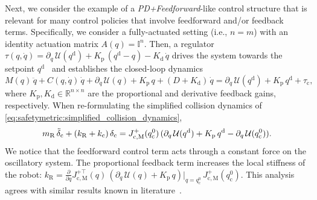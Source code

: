 Next, we consider the example of a \emph{PD+Feedforward}-like control structure that is relevant for many control policies that involve feedforward and/or feedback terms.
Specifically, we consider a fully-actuated setting (i.e., $n=m$) with an identity actuation matrix $A(q) = \mathbb{I}^n$.
Then, a regulator $\tau(q,\dot{q}) = \partial_{q} \, \mathcal{U}( q^\mathrm{d}) + K_\mathrm{p} \, (q^\mathrm{d}-q) - K_\mathrm{d} \, \dot{q}$ drives the system towards the setpoint $q^\mathrm{d}$~\citep{della2023model} and establishes the closed-loop dynamics
\begin{equation}
    M(q) \, \ddot{q} + C(q, \dot{q}) \, \dot{q} + \partial_{q} \, \mathcal{U}(q) + K_\mathrm{p} \, q + (D+K_\mathrm{d}) \, \dot{q} = \partial_{q} \, \mathcal{U}( q^\mathrm{d}) + K_\mathrm{p} \, q^\mathrm{d} + \tau_\mathrm{c},
\end{equation}
where $K_\mathrm{p}, K_\mathrm{d} \in \mathbb{R}^{n \times n}$ are the proportional and derivative feedback gains, respectively.
When re-formulating the simplified collision dynamics of \eqref{eq:safetymetric:simplified_collision_dynamics}, 
\begin{equation}
    m_\mathrm{R} \, \Ddot{\delta}_\mathrm{c} + (k_\mathrm{R} + k_\mathrm{c}) \, \delta_\mathrm{c} = J_\mathrm{c,M}^{+}(q_{\mathrm{c}}^0) \, (\partial_{q} \, \mathcal{U}(q^\mathrm{d}) +  K_\mathrm{p} \, q^\mathrm{d} - \partial_{q} \, \mathcal{U}(q_{\mathrm{c}}^0)).
\end{equation}
We notice that the feedforward control term acts through a constant force on the oscillatory system.
The proportional feedback term increases the local stiffness of the robot: $k_\mathrm{R} = \frac{\partial}{\partial q} J_\mathrm{c,M}^{+\top}(q) \, \left ( \partial_{q} \, \mathcal{U}(q) + K_\mathrm{p} \, q \right )\Big |_{q=q_{\mathrm{c}}^0} \,  J_\mathrm{c,M}^{+}(q_{\mathrm{c}}^0)$.
This analysis agrees with similar results known in literature~\citep{della2017controlling}.

